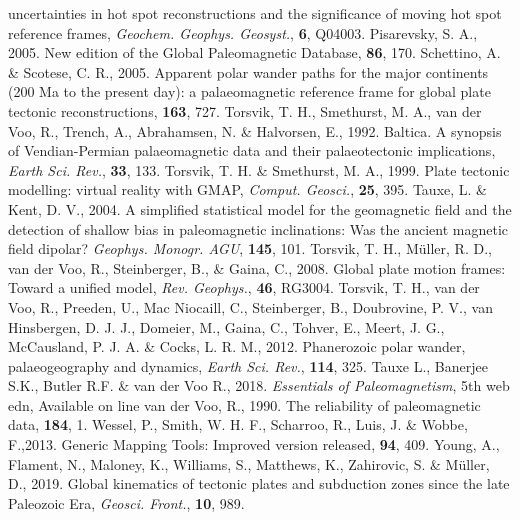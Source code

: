 \begin{thebibliography}{}
  uncertainties in hot spot reconstructions and the significance of moving hot
  spot reference frames, \textit{Geochem. Geophys. Geosyst.}, \textbf{6},
  Q04003.
  Pisarevsky, S. A., 2005. New edition of the Global Paleomagnetic Database,
  \eos{}\textbf{86}, 170.
  Schettino, A. \& Scotese, C. R., 2005. Apparent polar wander paths for the
  major continents (200 Ma to the present day): a palaeomagnetic reference frame
  for global plate tectonic reconstructions, \gji{}\textbf{163},
  727.
  Torsvik, T. H., Smethurst, M. A., van der Voo, R., Trench, A., Abrahamsen, N.
  \& Halvorsen, E., 1992. Baltica. A synopsis of Vendian-Permian palaeomagnetic
  data and their palaeotectonic implications, \textit{Earth Sci. Rev.},
  \textbf{33}, 133.
  Torsvik, T. H. \& Smethurst, M. A., 1999. Plate tectonic modelling: virtual
  reality with GMAP, \textit{Comput. Geosci.}, \textbf{25}, 395.
  Tauxe, L. \& Kent, D. V., 2004. A simplified statistical model for the
  geomagnetic field and the detection of shallow bias in paleomagnetic
  inclinations: Was the ancient magnetic field dipolar? \textit{Geophys.
  Monogr. AGU}, \textbf{145}, 101.
  Torsvik, T. H., M{\"{u}}ller, R. D., van der Voo, R., Steinberger, B., \&
  Gaina, C., 2008. Global plate motion frames: Toward a unified model,
  \textit{Rev. Geophys.}, \textbf{46}, RG3004.
  Torsvik, T. H., van der Voo, R., Preeden, U., Mac Niocaill, C., Steinberger,
  B., Doubrovine, P. V., van Hinsbergen, D. J. J., Domeier, M., Gaina, C.,
  Tohver, E., Meert, J. G., McCausland, P. J. A. \& Cocks, L. R. M., 2012.
  Phanerozoic polar wander, palaeogeography and dynamics, \textit{Earth Sci.
  Rev.}, \textbf{114}, 325.
  Tauxe L., Banerjee S.K., Butler R.F. \& van der Voo R., 2018.
  \textit{Essentials of Paleomagnetism}, 5th web edn, Available on line
  van der Voo, R., 1990. The reliability of paleomagnetic data,
  \tecto{}\textbf{184}, 1.
  Wessel, P., Smith, W. H. F., Scharroo, R., Luis, J. \& Wobbe, F.,2013. Generic
  Mapping Tools: Improved version released, \eos{}\textbf{94}, 409.
  Young, A., Flament, N., Maloney, K., Williams, S., Matthews, K., Zahirovic, S.
  \& M{\"{u}}ller, D., 2019. Global kinematics of tectonic plates and subduction
  zones since the late Paleozoic Era, \textit{Geosci. Front.},
  \textbf{10}, 989.
\end{thebibliography}~\label{lastpage}
